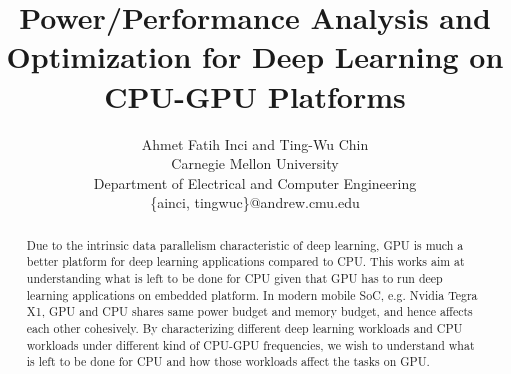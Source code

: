 \documentclass[times, 10pt,twocolumn]{article}
\begin{document}
\title{Power/Performance Analysis and Optimization for Deep Learning on CPU-GPU Platforms}

\author{Ahmet Fatih Inci and Ting-Wu Chin  \\
Carnegie Mellon University\\ Department of Electrical and Computer Engineering \\ \{ainci, tingwuc\}@andrew.cmu.edu\\
}
\maketitle
\thispagestyle{empty}

\begin{abstract}
    Due to the intrinsic data parallelism characteristic of deep learning, GPU is much a better platform for deep learning applications compared to CPU. This works aim at understanding what is left to be done for CPU given that GPU has to run deep learning applications on embedded platform. In modern mobile SoC, e.g. Nvidia Tegra X1, GPU and CPU shares same power budget and memory budget, and hence affects each other cohesively. By characterizing different deep learning workloads and CPU workloads under different kind of CPU-GPU frequencies, we wish to understand what is left to be done for CPU and how those workloads affect the tasks on GPU. 
\end{abstract}








\end{document}
